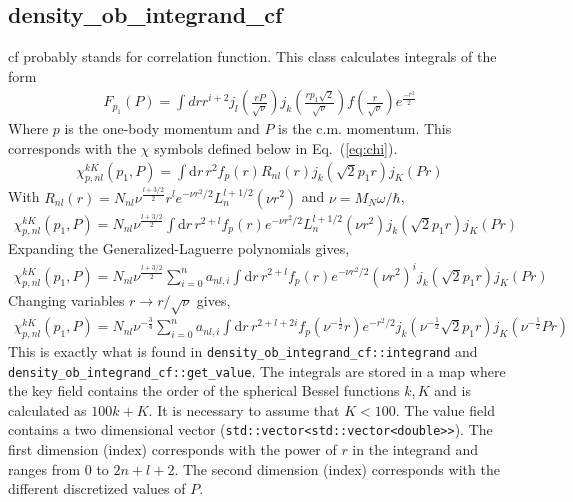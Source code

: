 \documentclass[10pt]{article}
\begin{document}
\subsection{ density\_ob\_integrand\_cf }
cf probably stands for correlation function. This class calculates integrals of the form
\begin{align*}
F_{p_1}(P) = \int dr r^{i+2} j_l(\frac{rP}{\sqrt{\nu}})  j_k(\frac{r p_1\sqrt{2}}{\sqrt{\nu}} )  f(\frac{r}{\sqrt{\nu}})  e^{\frac{-r^2}{2}}
\end{align*}
Where $p$ is the one-body momentum and $P$ is the c.m. momentum. This 
corresponds with the $\chi$ symbols defined below in Eq.~(\ref{eq:chi}).
\begin{align*}
	\chi_{p,nl}^{kK}(p_1,P) = \int \text{d} r\, r^{2} f_{p}(r) R_{n l}(r) j_{k}( \sqrt{2} p_1 r)  j_{K}(P r)
\end{align*}
With  $R_{nl}(r) = N_{nl} \nu^{\frac{l + 3/2}{2}} r^{l} e^{-\nu r^{2} /2} L_{n}^{l+1/2}(\nu r^{2})$ and $ \nu = M_N \omega / \hbar $,
\begin{align*}
	\chi_{p,nl}^{kK}(p_1,P) = N_{nl} \nu^{\frac{l + 3/2}{2}} \int \text{d} r\, r^{2+l} f_{p}(r)  e^{-\nu r^{2} /2} L_{n}^{l+1/2}(\nu r^{2}) j_{k}( \sqrt{2} p_1 r)  j_{K}(P r)
\end{align*}
Expanding the Generalized-Laguerre polynomials gives,
\begin{align*}
	\chi_{p,nl}^{kK}(p_1,P) = N_{nl} \nu^{\frac{l + 3/2}{2}} \sum_{i=0}^{n} a_{nl,i} \int \text{d} r\, r^{2+l} f_{p}(r)  e^{-\nu r^{2} /2}  (\nu r^{2})^{i} j_{k}( \sqrt{2} p_1 r)  j_{K}(P r)
\end{align*}
Changing variables $ r \rightarrow r/\sqrt{\nu}$ gives,
\begin{align*}
	\chi_{p,nl}^{kK}(p_1,P) =  N_{nl} \nu^{-\frac{3}{4}} \sum_{i=0}^{n} a_{nl,i} \int \text{d} r\, r^{2+l+2i} f_{p}( \nu^{-\frac{1}{2}} r)  e^{-r^{2} /2} j_{k}( \nu^{-\frac{1}{2}} \sqrt{2} p_1 r)  j_{K}(\nu^{-\frac{1}{2}} P r)
\end{align*}
This is exactly what is found in \texttt{density\_ob\_integrand\_cf::integrand} and \\ \texttt{density\_ob\_integrand\_cf::get\_value}.
The integrals are stored in a map where the key field contains the order of the spherical Bessel functions $k,K$ and is calculated as $100k+K$. It is necessary to assume that $ K < 100$.
The value field contains a two dimensional vector (\texttt{std::vector<std::vector<double>>}).
The first dimension (index) corresponds with the power of $r$ in the integrand and ranges from $0$ to $2n+l+2$.
The second dimension (index) corresponds with the different discretized values of $P$.
\end{document}
